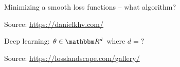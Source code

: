 \documentclass[
    xcolor={svgnames,dvipsnames},
    hyperref={colorlinks, citecolor=DeepPink4, linkcolor=DarkRed, urlcolor=DarkBlue}
    ]{beamer}  %
\newcommand{\1}{\mathbbm 1}
\newcommand{\RR}{\mathbbm R}
\begin{document}
\begin{frame}
    

    Minimizing a smooth loss functions  -- what algorithm?
    
    \begin{figure}
       \begin{center}
       \end{center}
    \end{figure}

    Source: \url{https://danielkhv.com/}

\end{frame}


\begin{frame}

    Deep learning: $\theta \in \RR^d$ where $d = ?$
    
    \begin{figure}
       \begin{center}
       \end{center}
    \end{figure}

    Source: \url{https://losslandscape.com/gallery/}

\end{frame}
\end{document}
